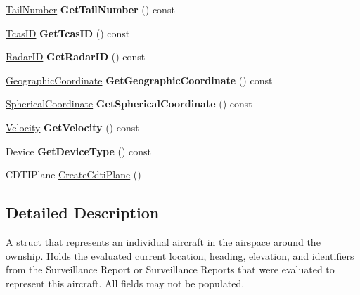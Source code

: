 \begin{DoxyCompactItemize}
\item 
\hypertarget{class_correlation_aircraft_ab961c122dc1f2a859ffb6b4e9ef58c1d}{}\hyperlink{class_tail_number}{Tail\+Number} {\bfseries Get\+Tail\+Number} () const \label{class_correlation_aircraft_ab961c122dc1f2a859ffb6b4e9ef58c1d}

\item 
\hypertarget{class_correlation_aircraft_aedd4a85633d71adf84f8f85329508b86}{}\hyperlink{class_tcas_i_d}{Tcas\+I\+D} {\bfseries Get\+Tcas\+I\+D} () const \label{class_correlation_aircraft_aedd4a85633d71adf84f8f85329508b86}

\item 
\hypertarget{class_correlation_aircraft_a253a843488f09cebadf875d89f7112be}{}\hyperlink{class_radar_i_d}{Radar\+I\+D} {\bfseries Get\+Radar\+I\+D} () const \label{class_correlation_aircraft_a253a843488f09cebadf875d89f7112be}

\item 
\hypertarget{class_correlation_aircraft_a9dc9e578264f3df07199357f6f5226ca}{}\hyperlink{class_geographic_coordinate}{Geographic\+Coordinate} {\bfseries Get\+Geographic\+Coordinate} () const \label{class_correlation_aircraft_a9dc9e578264f3df07199357f6f5226ca}

\item 
\hypertarget{class_correlation_aircraft_a49612336861e6bdd4db899af9b162e59}{}\hyperlink{class_spherical_coordinate}{Spherical\+Coordinate} {\bfseries Get\+Spherical\+Coordinate} () const \label{class_correlation_aircraft_a49612336861e6bdd4db899af9b162e59}

\item 
\hypertarget{class_correlation_aircraft_a033b8e179750f5f4f06a552f14517a89}{}\hyperlink{class_velocity}{Velocity} {\bfseries Get\+Velocity} () const \label{class_correlation_aircraft_a033b8e179750f5f4f06a552f14517a89}

\item 
\hypertarget{class_correlation_aircraft_a61d5d8418645a713992d90948a1eb6ce}{}Device {\bfseries Get\+Device\+Type} () const \label{class_correlation_aircraft_a61d5d8418645a713992d90948a1eb6ce}

\item 
C\+D\+T\+I\+Plane \hyperlink{class_correlation_aircraft_a5dfebd98e53fa074bcfb4976d21fde76}{Create\+Cdti\+Plane} ()
\end{DoxyCompactItemize}


\subsection{Detailed Description}
A struct that represents an individual aircraft in the airspace around the ownship. Holds the evaluated current location, heading, elevation, and identifiers from the Surveillance Report or Surveillance Reports that were evaluated to represent this aircraft. All fields may not be populated. 

